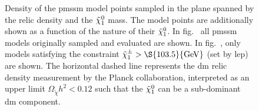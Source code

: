 \begin{figure}
\begin{subfigure}[b]{0.49\linewidth}
		\caption{\label{fig:relic_density_lsp_constraint}}
	\end{subfigure}\hfill
	\caption{Density of the \gls{pmssm} model points sampled in the plane spanned by the relic density and the $\tilde{\chi}_1^0$ mass. The model points are additionally shown as a function of the nature of their $\tilde{\chi}_1^0$. In fig.~ all \gls{pmssm} models originally sampled and evaluated are shown. In fig.~, only models satisfying the constraint $\charg > \S{103.5}{\GeV}$ (set by \gls{lep}) are shown. The horizontal dashed line represents the \gls{dm} relic density measurement by the Planck collaboration, interpreted as an upper limit $\Omega_{\tilde{\chi}} h^2 < 0.12$ such that the $\tilde{\chi}_1^0$ can be a sub-dominant \gls{dm} component.}
	\label{fig:relic_density_lsp_withConstraint}
\end{figure}
